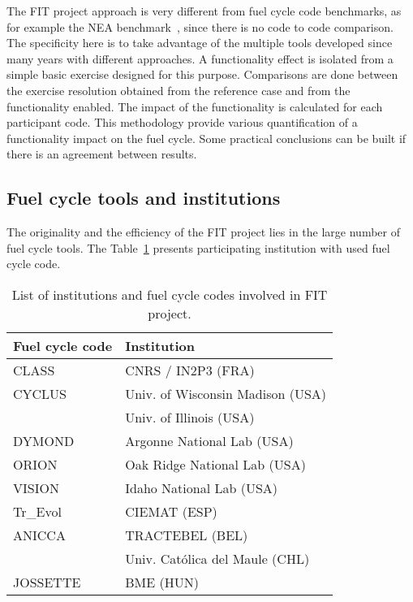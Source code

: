 The FIT project approach is very different from fuel cycle code benchmarks, as
for example the NEA benchmark~\cite{NEA2016}, since there is no code to code
comparison. The specificity here is to take advantage of the multiple tools
developed since many years with different approaches. A functionality effect is
isolated from a simple basic exercise designed for this purpose. Comparisons are
done between the exercise resolution obtained from the reference case and from
the functionality enabled. The impact of the functionality is calculated for
each participant code. This methodology provide various quantification of a
functionality impact on the fuel cycle. Some practical conclusions can be built
if there is an agreement between results.

\subsection{Fuel cycle tools and institutions}

The originality and the efficiency of the FIT project lies in the large number
of fuel cycle tools. The Table~\ref{Tab:Code} presents participating institution
with used fuel cycle code.

\begin{table}[h]
\centering
\begin{tabular}{ |l|l| }
  \hline
  Fuel cycle code & Institution \\
  \hline
  CLASS\cite{} & CNRS / IN2P3 (FRA) \\
  \hline
  CYCLUS\cite{} & Univ. of Wisconsin Madison (USA) \\
  & Univ. of Illinois (USA) \\
  \hline
  DYMOND\cite{} & Argonne National Lab (USA) \\
  \hline
  ORION\cite{} & Oak Ridge National Lab (USA) \\
  \hline
  VISION\cite{} & Idaho National Lab (USA) \\
  \hline
  Tr\_Evol\cite{} & CIEMAT (ESP) \\
  \hline
  ANICCA\cite{} & TRACTEBEL (BEL) \\
   & Univ. Católica del Maule (CHL) \\
  \hline
  JOSSETTE\cite{} & BME (HUN) \\
  \hline
\end{tabular}
\label{Tab:Code}
\caption{List of institutions and fuel cycle codes involved in FIT project.}
\end{table}

